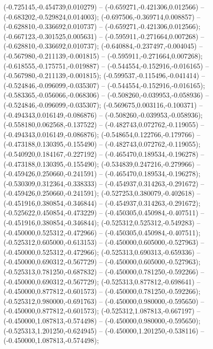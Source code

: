  (-0.725145,-0.454739,0.010279) -- (-0.659271,-0.421306,0.012566) -- (-0.683202,-0.529824,0.014003);
 (-0.697506,-0.369714,0.008857) -- (-0.628810,-0.336692,0.010737) -- (-0.659271,-0.421306,0.012566);
 (-0.667123,-0.301525,0.005631) -- (-0.595911,-0.271664,0.007268) -- (-0.628810,-0.336692,0.010737);
 (-0.640884,-0.237497,-0.004045) -- (-0.567980,-0.211139,-0.001815) -- (-0.595911,-0.271664,0.007268);
 (-0.618555,-0.175751,-0.019887) -- (-0.544554,-0.152916,-0.016165) -- (-0.567980,-0.211139,-0.001815);
 (-0.599537,-0.115496,-0.041414) -- (-0.524846,-0.096099,-0.035307) -- (-0.544554,-0.152916,-0.016165);
 (-0.583365,-0.056066,-0.068306) -- (-0.508260,-0.039953,-0.058936) -- (-0.524846,-0.096099,-0.035307);
 (-0.569675,0.003116,-0.100371) -- (-0.494343,0.016149,-0.086876) -- (-0.508260,-0.039953,-0.058936);
 (-0.558180,0.062568,-0.137522) -- (-0.482743,0.072762,-0.119055) -- (-0.494343,0.016149,-0.086876);
 (-0.548654,0.122766,-0.179766) -- (-0.473188,0.130395,-0.155490) -- (-0.482743,0.072762,-0.119055);
 (-0.540920,0.184167,-0.227192) -- (-0.465470,0.189534,-0.196278) -- (-0.473188,0.130395,-0.155490);
 (-0.534839,0.247216,-0.279966) -- (-0.459426,0.250660,-0.241591) -- (-0.465470,0.189534,-0.196278);
 (-0.530309,0.312364,-0.338333) -- (-0.454937,0.314263,-0.291672) -- (-0.459426,0.250660,-0.241591);
 (-0.527253,0.380079,-0.402618) -- (-0.451916,0.380854,-0.346844) -- (-0.454937,0.314263,-0.291672);
 (-0.525622,0.450854,-0.473229) -- (-0.450305,0.450984,-0.407511) -- (-0.451916,0.380854,-0.346844);
 (-0.525312,0.525312,-0.549283) -- (-0.450000,0.525312,-0.472966) -- (-0.450305,0.450984,-0.407511);
 (-0.525312,0.605000,-0.613153) -- (-0.450000,0.605000,-0.527963) -- (-0.450000,0.525312,-0.472966);
 (-0.525313,0.690313,-0.659336) -- (-0.450000,0.690312,-0.567729) -- (-0.450000,0.605000,-0.527963);
 (-0.525313,0.781250,-0.687832) -- (-0.450000,0.781250,-0.592266) -- (-0.450000,0.690312,-0.567729);
 (-0.525313,0.877812,-0.698641) -- (-0.450000,0.877812,-0.601573) -- (-0.450000,0.781250,-0.592266);
 (-0.525312,0.980000,-0.691763) -- (-0.450000,0.980000,-0.595650) -- (-0.450000,0.877812,-0.601573);
 (-0.525312,1.087813,-0.667197) -- (-0.450000,1.087813,-0.574498) -- (-0.450000,0.980000,-0.595650);
 (-0.525313,1.201250,-0.624945) -- (-0.450000,1.201250,-0.538116) -- (-0.450000,1.087813,-0.574498);
